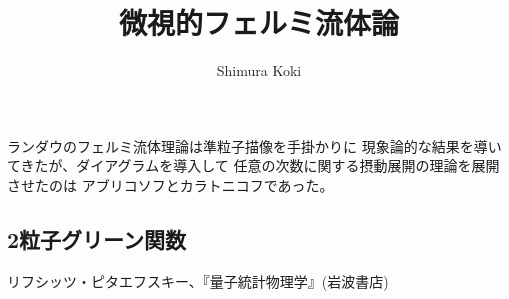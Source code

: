 \documentclass[11pt,a4j]{jarticle}
\title{微視的フェルミ流体論}
\author{Shimura Koki}
\date{}
\begin{document}
\maketitle
\section{}
\subsection{}
ランダウのフェルミ流体理論は準粒子描像を手掛かりに
現象論的な結果を導いてきたが、ダイアグラムを導入して
任意の次数に関する摂動展開の理論を展開させたのは
アブリコソフとカラトニコフであった。

\subsection{2粒子グリーン関数}

\begin{thebibliography}{99}
     リフシッツ・ピタエフスキー、『量子統計物理学』(岩波書店)
\end{thebibliography}
\end{document}

